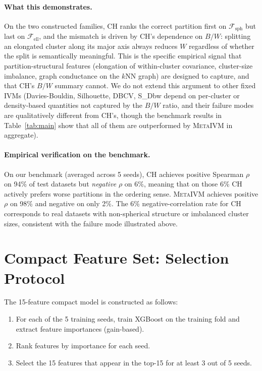 \documentclass[10pt]{article} %
\newcommand{\ours}{\textsc{MetaIVM}}
\begin{document}
\paragraph{What this demonstrates.} On the two constructed families, CH ranks the correct partition first on $\mathcal{F}_{\text{sph}}$ but last on $\mathcal{F}_{\text{ell}}$, and the mismatch is driven by CH's dependence on $B/W$: splitting an elongated cluster along its major axis always reduces $W$ regardless of whether the split is semantically meaningful. This is the specific empirical signal that partition-structural features (elongation of within-cluster covariance, cluster-size imbalance, graph conductance on the $k$NN graph) are designed to capture, and that CH's $B/W$ summary cannot. We do not extend this argument to other fixed IVMs (Davies-Bouldin, Silhouette, DBCV, S\_Dbw depend on per-cluster or density-based quantities not captured by the $B/W$ ratio, and their failure modes are qualitatively different from CH's, though the benchmark results in Table~\ref{tab:main} show that all of them are outperformed by \ours{} in aggregate).

\paragraph{Empirical verification on the benchmark.} On our benchmark (averaged across 5 seeds), CH achieves positive Spearman $\rho$ on 94\% of test datasets but \emph{negative} $\rho$ on 6\%, meaning that on those 6\% CH actively prefers worse partitions in the ordering sense. \ours{} achieves positive $\rho$ on 98\% and negative on only 2\%. The 6\% negative-correlation rate for CH corresponds to real datasets with non-spherical structure or imbalanced cluster sizes, consistent with the failure mode illustrated above.


\section{Compact Feature Set: Selection Protocol}
\label{app:compact}

The 15-feature compact model is constructed as follows:
\begin{enumerate}
    \item For each of the 5 training seeds, train XGBoost on the training fold and extract feature importances (gain-based).
    \item Rank features by importance for each seed.
    \item Select the 15 features that appear in the top-15 for at least 3 out of 5 seeds.
\end{enumerate}
\end{document}
